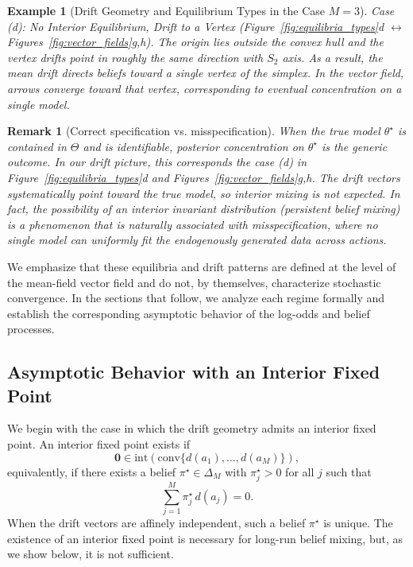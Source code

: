 \documentclass[12pt]{article}
\newtheorem{remark}{Remark}
\newtheorem{example}{Example}
\begin{document}
\begin{example}[Drift Geometry and Equilibrium Types in the Case $M=3$]
\textit{Case (d): No Interior Equilibrium, Drift to a Vertex} (Figure~\ref{fig:equilibria_types}d $\leftrightarrow$ Figures~\ref{fig:vector_fields}g,h).
The origin lies outside the convex hull and the vertex drifts point in roughly the same direction with $S_2$ axis. As a result, the mean drift directs beliefs toward a single vertex of the simplex.
In the vector field, arrows converge toward that vertex, corresponding to eventual concentration on a single model.
    
\end{example}

\begin{remark}[Correct specification vs. misspecification]
When the true model $\theta^\star$ is contained in $\Theta$ and is identifiable, posterior concentration on $\theta^\star$ is the generic outcome. In our drift picture, this corresponds the case (d) in Figure~\ref{fig:equilibria_types}d and Figures~\ref{fig:vector_fields}g,h. The drift vectors systematically point toward the true model, so interior mixing is not expected. In fact, the possibility of an interior invariant distribution (persistent belief mixing) is a phenomenon that is naturally associated with misspecification, where no single model can uniformly fit the endogenously generated data across actions.
\end{remark}

We emphasize that these equilibria and drift patterns are defined at the level of the mean-field vector field and do not, by themselves, characterize stochastic convergence.
In the sections that follow, we analyze each regime formally and establish the corresponding asymptotic behavior of the log-odds and belief processes.

\subsection{Asymptotic Behavior with an Interior Fixed Point}

We begin with the case in which the drift geometry admits an interior fixed point.
An interior fixed point exists if
\[
\mathbf{0} \in \mathrm{int}\!\left(\mathrm{conv}\{d(a_1),\ldots,d(a_M)\}\right),
\]
equivalently, if there exists a belief $\pi^\star \in \Delta_M$ with $\pi^\star_j>0$ for all $j$ such that
\[
\sum_{j=1}^M \pi^\star_j\, d(a_j) = 0.
\]
When the drift vectors are affinely independent, such a belief $\pi^\star$ is unique.
The existence of an interior fixed point is necessary for long-run belief mixing, but, as we show below, it is not sufficient.
\end{document}
